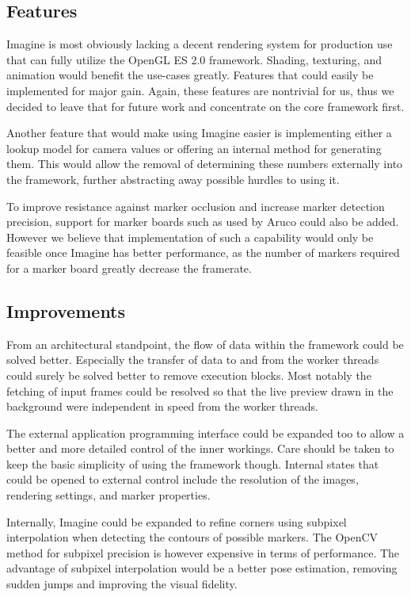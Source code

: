 \subsection{Features}

Imagine is most obviously lacking a decent rendering system for production use that can fully utilize the OpenGL ES 2.0 framework.
Shading, texturing, and animation would benefit the use-cases greatly.
Features that could easily be implemented for major gain.
Again, these features are nontrivial for us, thus we decided to leave that for future work and concentrate on the core framework first.

Another feature that would make using Imagine easier is implementing either a lookup model for camera values or offering an internal method for generating them.
This would allow the removal of determining these numbers externally into the framework, further abstracting away possible hurdles to using it.

To improve resistance against marker occlusion and increase marker detection precision, support for marker boards such as used by Aruco could also be added.
However we believe that implementation of such a capability would only be feasible once Imagine has better performance, as the number of markers required for a marker board greatly decrease the framerate.

\subsection{Improvements}
\label{improvements}

From an architectural standpoint, the flow of data within the framework could be solved better.
Especially the transfer of data to and from the worker threads could surely be solved better to remove execution blocks.
Most notably the fetching of input frames could be resolved so that the live preview drawn in the background were independent in speed from the worker threads.

The external application programming interface could be expanded too to allow a better and more detailed control of the inner workings.
Care should be taken to keep the basic simplicity of using the framework though.
Internal states that could be opened to external control include the resolution of the images, rendering settings, and marker properties.

Internally, Imagine could be expanded to refine corners using subpixel interpolation when detecting the contours of possible markers.
The OpenCV method for subpixel precision is however expensive in terms of performance.
The advantage of subpixel interpolation would be a better pose estimation, removing sudden jumps and improving the visual fidelity.

